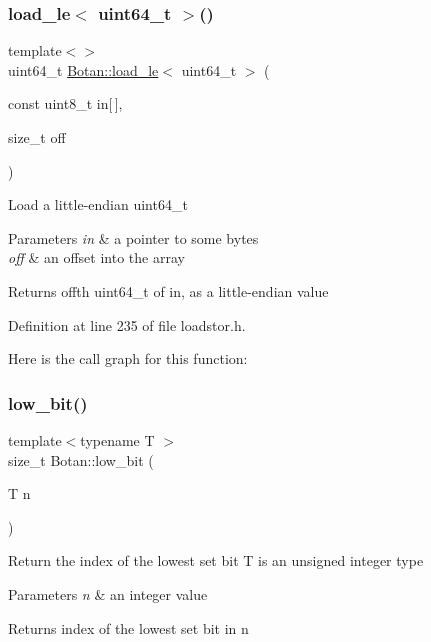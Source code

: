 \subsubsection{\texorpdfstring{load\+\_\+le$<$ uint64\+\_\+t $>$()}{load\_le< uint64\_t >()}}
{\footnotesize\ttfamily template$<$$>$ \\
uint64\+\_\+t \mbox{\hyperlink{namespace_botan_a745efa1d08234fe3b785f17c19ec26b7}{Botan\+::load\+\_\+le}}$<$ uint64\+\_\+t $>$ (\begin{DoxyParamCaption}\item[{const uint8\+\_\+t}]{in\mbox{[}$\,$\mbox{]},  }\item[{size\+\_\+t}]{off }\end{DoxyParamCaption})\hspace{0.3cm}{\ttfamily [inline]}}

Load a little-\/endian uint64\+\_\+t 
\begin{DoxyParams}{Parameters}
{\em in} & a pointer to some bytes \\
\hline
{\em off} & an offset into the array \\
\hline
\end{DoxyParams}
\begin{DoxyReturn}{Returns}
off\textquotesingle{}th uint64\+\_\+t of in, as a little-\/endian value 
\end{DoxyReturn}


Definition at line 235 of file loadstor.\+h.

Here is the call graph for this function\+:
\mbox{\label{namespace_botan_aae0c04508a1e70c5d4ecf363e8b75f00}} 
\subsubsection{\texorpdfstring{low\+\_\+bit()}{low\_bit()}}
{\footnotesize\ttfamily template$<$typename T $>$ \\
size\+\_\+t Botan\+::low\+\_\+bit (\begin{DoxyParamCaption}\item[{T}]{n }\end{DoxyParamCaption})\hspace{0.3cm}{\ttfamily [inline]}}

Return the index of the lowest set bit T is an unsigned integer type 
\begin{DoxyParams}{Parameters}
{\em n} & an integer value \\
\hline
\end{DoxyParams}
\begin{DoxyReturn}{Returns}
index of the lowest set bit in n 
\end{DoxyReturn}


